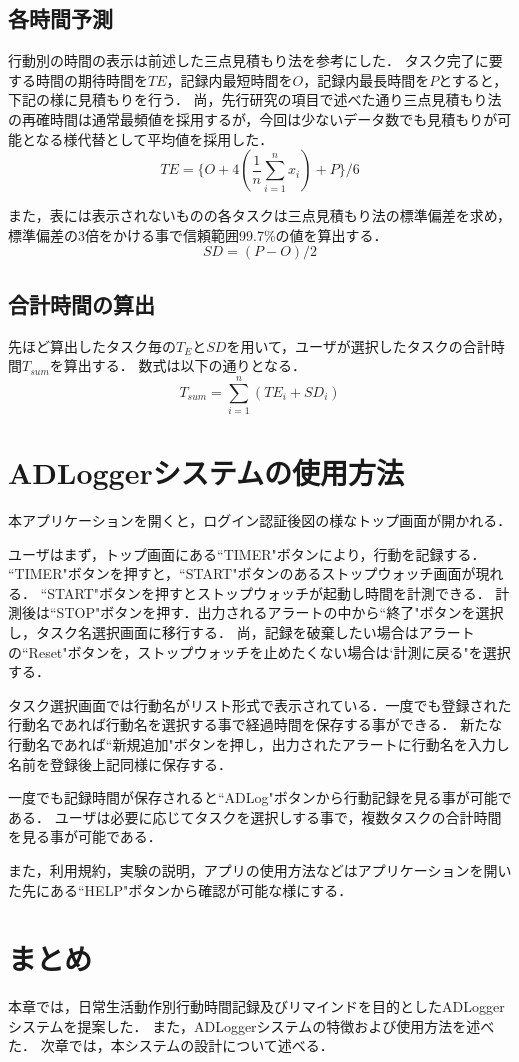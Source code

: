 \subsection{各時間予測}
行動別の時間の表示は前述した三点見積もり法を参考にした．
タスク完了に要する時間の期待時間を$TE$，記録内最短時間を$O$，記録内最長時間を$P$とすると，下記の様に見積もりを行う．
尚，先行研究の項目で述べた通り三点見積もり法の再確時間は通常最頻値を採用するが，今回は少ないデータ数でも見積もりが可能となる様代替として平均値を採用した．
\[ TE=\{ O + 4(\frac{1}{n}\displaystyle\sum_{i=1}^{n}x_{i}) + P\}/6\]

また，表には表示されないものの各タスクは三点見積もり法の標準偏差を求め，標準偏差の3倍をかける事で信頼範囲99.7\%の値を算出する．
\[ SD = (P - O)/2\]

\subsection{合計時間の算出}

先ほど算出したタスク毎の$T_{E}$と$SD$を用いて，ユーザが選択したタスクの合計時間$T_{sum}$を算出する．
数式は以下の通りとなる．
\[ T_{sum}= \displaystyle\sum_{i=1}^{n} (TE_{i} + SD_{i})\]




\section{ADLoggerシステムの使用方法}
本アプリケーションを開くと，ログイン認証後図の様なトップ画面が開かれる．%

ユーザはまず，トップ画面にある``TIMER"ボタンにより，行動を記録する．
``TIMER"ボタンを押すと，``START"ボタンのあるストップウォッチ画面が現れる．
``START"ボタンを押すとストップウォッチが起動し時間を計測できる．
計測後は``STOP"ボタンを押す．出力されるアラートの中から``終了"ボタンを選択し，タスク名選択画面に移行する．
尚，記録を破棄したい場合はアラートの``Reset"ボタンを，ストップウォッチを止めたくない場合は`計測に戻る"を選択する．

タスク選択画面では行動名がリスト形式で表示されている．一度でも登録された行動名であれば行動名を選択する事で経過時間を保存する事ができる．
新たな行動名であれば``新規追加"ボタンを押し，出力されたアラートに行動名を入力し名前を登録後上記同様に保存する．

一度でも記録時間が保存されると``ADLog"ボタンから行動記録を見る事が可能である．
ユーザは必要に応じてタスクを選択しする事で，複数タスクの合計時間を見る事が可能である．

また，利用規約，実験の説明，アプリの使用方法などはアプリケーションを開いた先にある``HELP"ボタンから確認が可能な様にする．


\section{まとめ}
本章では，日常生活動作別行動時間記録及びリマインドを目的としたADLoggerシステムを提案した．
また，ADLoggerシステムの特徴および使用方法を述べた．
次章では，本システムの設計について述べる．